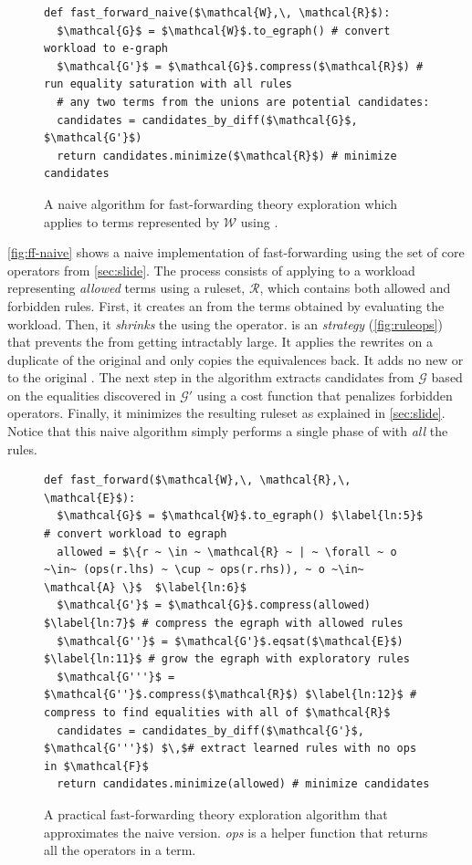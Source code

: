 \begin{figure}
\begin{lstlisting}
def fast_forward_naive($\mathcal{W},\, \mathcal{R}$):
  $\mathcal{G}$ = $\mathcal{W}$.to_egraph() # convert workload to e-graph
  $\mathcal{G'}$ = $\mathcal{G}$.compress($\mathcal{R}$) # run equality saturation with all rules
  # any two terms from the unions are potential candidates:
  candidates = candidates_by_diff($\mathcal{G}$, $\mathcal{G'}$)
  return candidates.minimize($\mathcal{R}$) # minimize candidates
\end{lstlisting}
  \caption{A naive algorithm for fast-forwarding theory exploration which
  applies \eqsat to terms represented by $\mathcal{W}$ using
  .}
\label{fig:ff-naive}
\end{figure}

\autoref{fig:ff-naive} shows a naive implementation
  of fast-forwarding
  using the set of core \enumo operators
  from \autoref{sec:slide}.
The process consists of
  applying  to a workload representing
  \textit{allowed} terms
  using a ruleset, $\mathcal{R}$, which contains both
  allowed and forbidden rules.
First, it creates an \eggl from the terms obtained by
  evaluating the workload.
Then, it \textit{shrinks} the \egraph using the
   operator.
 is an \eqsat \textit{strategy} (\autoref{fig:ruleops}) that prevents
  the \egraph from getting intractably large.
It applies the rewrites on a duplicate of the original
  \egraph and only copies the
  equivalences back.
It adds no new \enodes or \eclasses to the original \egraph.
The next step in the algorithm extracts candidates from $\mathcal{G}$
  based on the equalities discovered in $\mathcal{G'}$
  using a cost function that penalizes forbidden operators.
Finally, it minimizes the resulting ruleset as explained
  in \autoref{sec:slide}.
Notice that this naive algorithm
  simply performs a single phase of  with
  \textit{all} the rules.

\begin{figure}
\begin{lstlisting}
def fast_forward($\mathcal{W},\, \mathcal{R},\, \mathcal{E}$):
  $\mathcal{G}$ = $\mathcal{W}$.to_egraph() $\label{ln:5}$ # convert workload to egraph
  allowed = $\{r ~ \in ~ \mathcal{R} ~ | ~ \forall ~ o ~\in~ (ops(r.lhs) ~ \cup ~ ops(r.rhs)), ~ o ~\in~ \mathcal{A} \}$  $\label{ln:6}$
  $\mathcal{G'}$ = $\mathcal{G}$.compress(allowed) $\label{ln:7}$ # compress the egraph with allowed rules
  $\mathcal{G''}$ = $\mathcal{G'}$.eqsat($\mathcal{E}$) $\label{ln:11}$ # grow the egraph with exploratory rules
  $\mathcal{G'''}$ = $\mathcal{G''}$.compress($\mathcal{R}$) $\label{ln:12}$ # compress to find equalities with all of $\mathcal{R}$
  candidates = candidates_by_diff($\mathcal{G'}$, $\mathcal{G'''}$) $\,$# extract learned rules with no ops in $\mathcal{F}$
  return candidates.minimize(allowed) # minimize candidates
\end{lstlisting}
\caption{A practical fast-forwarding theory exploration algorithm that
  approximates the naive version. \textit{ops} is a helper function that returns
  all the operators in a term.}
\label{fig:ff-actual}
\end{figure}

